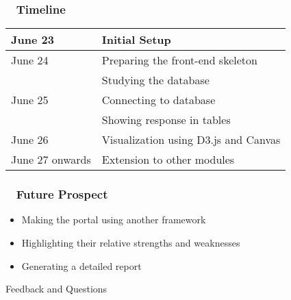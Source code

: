 \documentclass{beamer}
\begin{document}
\begin{frame}
\frametitle{~ Timeline}
\begin{center}

\begin{tabular}{|l|l|}
     \hline
     June 23 & Initial Setup\\
     \hline
     June 24 & Preparing the front-end skeleton\\
     \hline & Studying the database\\
     \hline
     June 25 & Connecting to database\\
     \hline & Showing response in tables\\
     \hline
     June 26 & Visualization using D3.js and Canvas\\
     \hline
     June 27 onwards & Extension to other modules\\
     \hline
     
\end{tabular}
\end{center}    
\end{frame}

\begin{frame}
\frametitle{ ~ Future Prospect} 
\begin{itemize}
\item{Making the portal using another framework}
\item{Highlighting their relative strengths and weaknesses}
\item{Generating a detailed report}
\end{itemize}
\end{frame}



\begin{frame}
\Huge{Feedback and Questions}
\end{frame}

\end{document}
